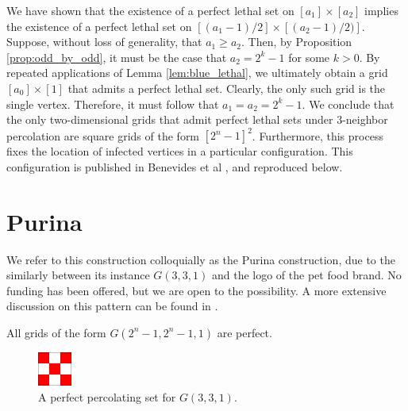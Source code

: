 
We have shown that the existence of a perfect lethal set on $[a_1] \times [a_2]$ implies the existence of a perfect lethal set on $[(a_1-1)/2] \times [(a_2-1)/2)]$. Suppose, without loss of generality, that $a_1 \geq a_2$. Then, by Proposition \ref{prop:odd_by_odd}, it must be the case that $a_2 = 2^{k}-1$ for some $k> 0$. By repeated applications of Lemma \ref{lem:blue_lethal}, we ultimately obtain a grid $[a_0] \times [1]$ that admits a perfect lethal set. Clearly, the only such grid is the single vertex. Therefore, it must follow that $a_1 = a_2 = 2^k-1$. We conclude that the only two-dimensional grids that admit perfect lethal sets under 3-neighbor percolation are square grids of the form $[2^n-1]^2$. Furthermore, this process fixes the location of infected vertices in a particular configuration. This configuration is published in Benevides et al \cite{benevides:2021}, and reproduced below.

\section{Purina}

We refer to this construction colloquially as the Purina construction, due to the similarly between its instance $G(3,3,1)$ and the logo of the pet food brand. No funding has been offered, but we are open to the possibility. A more extensive discussion on this pattern can be found in \cite{benevides:2021}.

\begin{con}
\label{con:purina}
All grids of the form $G(2^n-1, 2^n-1, 1)$ are perfect.
\end{con}

\begin{figure}[]
\centering
\includegraphics[width=0.1\textwidth]{figures/7/3x3x1.pdf}
\caption{A perfect percolating set for $G(3,3,1)$.}
\label{fig:3x3x1}
\end{figure} 

